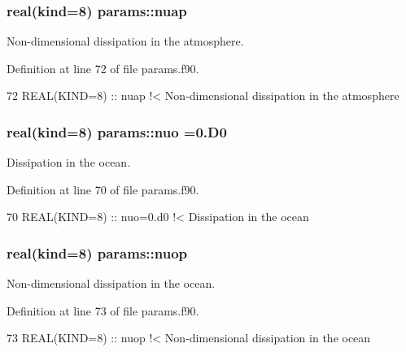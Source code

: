 \subsubsection[{\texorpdfstring{nuap}{nuap}}]{\setlength{\rightskip}{0pt plus 5cm}real(kind=8) params\+::nuap}\hypertarget{namespaceparams_a3a0962facf5be13872568dd81f95453c}{}\label{namespaceparams_a3a0962facf5be13872568dd81f95453c}


Non-\/dimensional dissipation in the atmosphere. 



Definition at line 72 of file params.\+f90.


\begin{DoxyCode}
72   \textcolor{keywordtype}{REAL(KIND=8)} :: nuap\textcolor{comment}{      !< Non-dimensional dissipation in the atmosphere}
\end{DoxyCode}
\subsubsection[{\texorpdfstring{nuo}{nuo}}]{\setlength{\rightskip}{0pt plus 5cm}real(kind=8) params\+::nuo =0.D0}\hypertarget{namespaceparams_a49937b0c51e9f89ac9b2f332d387af2f}{}\label{namespaceparams_a49937b0c51e9f89ac9b2f332d387af2f}


Dissipation in the ocean. 



Definition at line 70 of file params.\+f90.


\begin{DoxyCode}
70   \textcolor{keywordtype}{REAL(KIND=8)} :: nuo=0.d0  \textcolor{comment}{!< Dissipation in the ocean}
\end{DoxyCode}
\subsubsection[{\texorpdfstring{nuop}{nuop}}]{\setlength{\rightskip}{0pt plus 5cm}real(kind=8) params\+::nuop}\hypertarget{namespaceparams_a4802663c55680d2c51142f63636abd2e}{}\label{namespaceparams_a4802663c55680d2c51142f63636abd2e}


Non-\/dimensional dissipation in the ocean. 



Definition at line 73 of file params.\+f90.


\begin{DoxyCode}
73   \textcolor{keywordtype}{REAL(KIND=8)} :: nuop\textcolor{comment}{      !< Non-dimensional dissipation in the ocean}
\end{DoxyCode}

